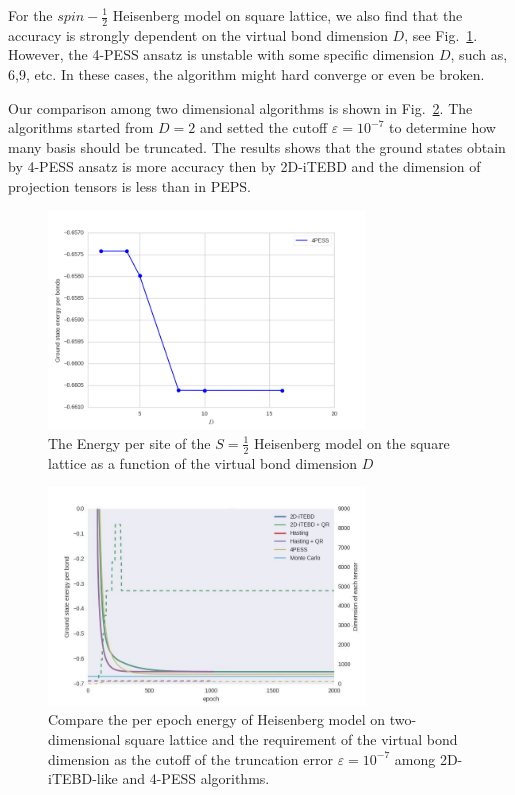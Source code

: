 For the $spin- \frac{1}{2}$ Heisenberg model on square lattice, we also find that the accuracy is strongly dependent on the virtual bond dimension $D$, see Fig.~\ref{fig4332}. However, the 4-PESS ansatz is unstable with some specific dimension $D$, such as, 6,9, etc. In these cases, the algorithm might hard converge or even be broken. 

Our comparison among two dimensional algorithms is shown in Fig.~\ref{fig4333}. The algorithms started from $D=2$ and setted the cutoff $\varepsilon = 10^{-7}$ to determine how many basis should be truncated. The results shows that the ground states obtain by 4-PESS ansatz is more accuracy then by 2D-iTEBD and the dimension of projection tensors is less than in PEPS.

\begin{figure}[H]
	\centering
	\includegraphics[width=0.75\textwidth]{figures/4pess_HeiGE.png}
	\caption[The Energy per site of the $S=\frac{1}{2}$ Heisenberg model on the square lattice as a function of the virtual bond dimension $D$]{The Energy per site of the $S=\frac{1}{2}$ Heisenberg model on the square lattice as a function of the virtual bond dimension $D$}
	\label{fig4332}
\end{figure}

\begin{figure}[H]
	\centering
	\includegraphics[width=0.75\textwidth]{figures/compare_4pess.jpeg}
	\caption[Compare the per epoch energy of Heisenberg model on two-dimensional square lattice and the requirement of the virtaul bond dimension as the cutoff of the truncation error $\varepsilon = 10^{-7}$ among 2D-iTEBD-like and 4-PESS algorithms]{Compare the per epoch energy of Heisenberg model on two-dimensional square lattice and the requirement of the virtual bond dimension as the cutoff of the truncation error $\varepsilon = 10^{-7}$ among 2D-iTEBD-like and 4-PESS algorithms.}
	\label{fig4333}
\end{figure}
